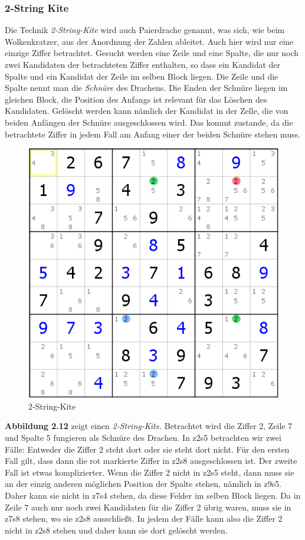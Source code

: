 \newpage
\subsubsection{2-String Kite}
Die Technik \textit{2-String-Kite} wird auch Paierdrache genannt, was sich, wie beim Wolkenkratzer, aus der Anordnung der Zahlen ableitet. Auch hier wird nur eine einzige Ziffer betrachtet. Gesucht werden eine Zeile und eine Spalte, die nur noch zwei Kandidaten der betrachteten Ziffer enthalten, so dass ein Kandidat der Spalte und ein Kandidat der Zeile im selben Block liegen. Die Zeile und die Spalte nennt man die \textit{Schnüre} des Drachens. Die Enden der Schnüre liegen im gleichen Block, die Position des Anfangs ist relevant für das Löschen des Kandidaten. Gelöscht werden kann nämlich der Kandidat in der Zelle, die von beiden Anfängen der Schnüre ausgeschlossen wird. Das kommt zustande, da die betrachtete Ziffer in jedem Fall am Anfang einer der beiden Schnüre stehen muss.

\begin{figure}[h]
\begin{center}
\includegraphics{./img/2stringkite.png}
\caption{2-String-Kite}
\end{center}
\end{figure}

\textbf{Abbildung 2.12} zeigt einen \textit{2-String-Kite}. Betrachtet wird die Ziffer 2, Zeile 7 und Spalte 5 fungieren als Schnüre des Drachen. In z2s5 betrachten wir zwei Fälle: Entweder die Ziffer 2 steht dort oder sie steht dort nicht. Für den ersten Fall gilt, dass dann die rot markierte Ziffer in z2s8 ausgeschlossen ist. Der zweite Fall ist etwas komplizierter. Wenn die Ziffer 2 nicht in z2s5 steht, dann muss sie an der einzig anderen möglichen Position der Spalte stehen, nämlich in z9s5. Daher kann sie nicht in z7s4 stehen, da diese Felder im selben Block liegen. Da in Zeile 7 auch nur noch zwei Kandidaten für die Ziffer 2 übrig waren, muss sie in z7s8 stehen, wo sie z2s8 ausschließt. In jedem der Fälle kann also die Ziffer 2 nicht in z2s8 stehen und daher kann sie dort gelöscht werden.
